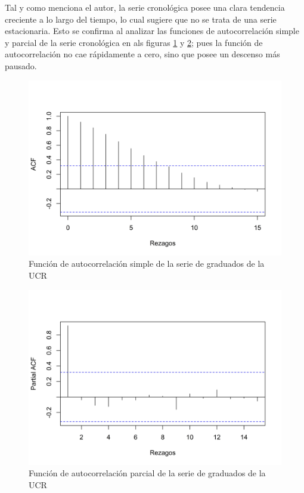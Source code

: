 \documentclass[
]{article}
\begin{document}
Tal y como menciona el autor, la serie cronológica posee una clara
tendencia creciente a lo largo del tiempo, lo cual sugiere que no se
trata de una serie estacionaria. Esto se confirma al analizar las
funciones de autocorrelación simple y parcial de la serie cronológica en
als figuras \ref{fig:auto_ucr1} y \ref{fig:parcial_ucr1}; pues la
función de autocorrelación no cae rápidamente a cero, sino que posee un
descenso más pausado.

\begin{figure}[H]
\includegraphics[width=1\linewidth,height=1\textheight]{Tesis_files/figure-latex/auto_ucr1-1} \caption{Función de autocorrelación simple de la serie de graduados de la UCR}\label{fig:auto_ucr1}
\end{figure}

\begin{figure}[H]
\includegraphics[width=1\linewidth,height=1\textheight]{Tesis_files/figure-latex/parcial_ucr1-1} \caption{Función de autocorrelación parcial de la serie de graduados de la UCR}\label{fig:parcial_ucr1}
\end{figure}
\end{document}
